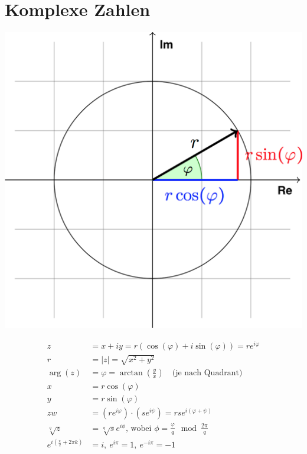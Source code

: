 \section{Komplexe Zahlen}

\begin{minipage}[c]{0.5\textwidth}
\centering
\includegraphics[width=\linewidth,keepaspectratio=true]{images/polarform}
\end{minipage}
%
\begin{minipage}[c]{0.5\textwidth}
\begin{equation*}
\begin{split}
	z & = x + iy = r(\cos(\varphi) + i\sin(\varphi)) = re^{i\varphi} \\
	r & = |z| = \sqrt{x^2 + y^2} \\
	\arg(z) & = \varphi  = \arctan(\frac{y}{x}) \quad \text{(je nach Quadrant)}  \\
	x & = r\cos(\varphi) \\
	y & = r\sin(\varphi) \\
	zw & = (re^{i\varphi})\cdot(se^{i\psi}) = rse^{i(\varphi + \psi)} \\
	\sqrt[q]{z} & = \sqrt[q]{s}e^{i\phi}\text{, wobei }\phi = \frac{\varphi}{q} \mod \frac{2\pi}{q} \\
	e^{i(\frac{\pi}{2} + 2\pi k)} & = i,\ e^{i\pi} = 1, \ e^{-i\pi} = -1
\end{split}
\end{equation*}
\end{minipage}

